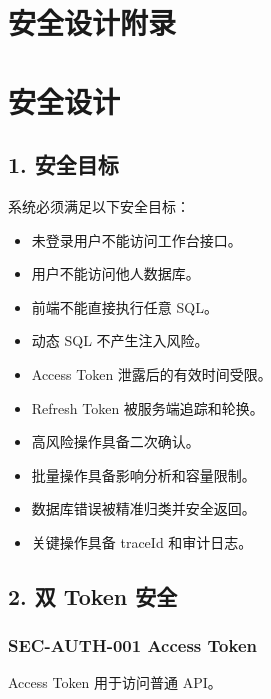\documentclass[
  a4paper,
  UTF8]{ctexart}
\providecommand{\tightlist}{%
  \setlength{\itemsep}{0pt}\setlength{\parskip}{0pt}}
\begin{document}
\hypertarget{ux5b89ux5168ux8bbeux8ba1ux9644ux5f55}{%
\section{安全设计附录}\label{ux5b89ux5168ux8bbeux8ba1ux9644ux5f55}}

\hypertarget{ux5b89ux5168ux8bbeux8ba1}{%
\section{安全设计}\label{ux5b89ux5168ux8bbeux8ba1}}

\hypertarget{ux5b89ux5168ux76eeux6807}{%
\subsection{1. 安全目标}\label{ux5b89ux5168ux76eeux6807}}

系统必须满足以下安全目标：

\begin{itemize}
\tightlist
\item
  未登录用户不能访问工作台接口。
\item
  用户不能访问他人数据库。
\item
  前端不能直接执行任意 SQL。
\item
  动态 SQL 不产生注入风险。
\item
  Access Token 泄露后的有效时间受限。
\item
  Refresh Token 被服务端追踪和轮换。
\item
  高风险操作具备二次确认。
\item
  批量操作具备影响分析和容量限制。
\item
  数据库错误被精准归类并安全返回。
\item
  关键操作具备 traceId 和审计日志。
\end{itemize}

\hypertarget{ux53cc-token-ux5b89ux5168}{%
\subsection{2. 双 Token 安全}\label{ux53cc-token-ux5b89ux5168}}

\hypertarget{sec-auth-001-access-token}{%
\subsubsection{SEC-AUTH-001 Access
Token}\label{sec-auth-001-access-token}}

Access Token 用于访问普通 API。
\end{document}

